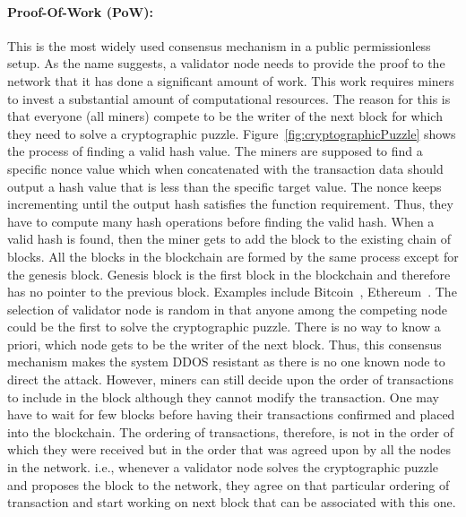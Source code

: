 \paragraph{Proof-Of-Work (PoW):}This is the most widely
used consensus mechanism in a public permissionless setup. As the name
suggests, a validator node needs to provide the proof to the network that it
has done a significant amount of work. This work requires miners to invest a
substantial amount of computational resources. The reason for this is that
everyone (all miners) compete to be the writer of the next block for which they
need to solve a cryptographic puzzle. Figure~\ref{fig:cryptographicPuzzle}
shows the process of finding a valid hash value. The miners are supposed to
find a specific nonce value which when concatenated with the transaction data
should output a hash value that is less than the specific target value. The
nonce keeps incrementing until the output hash satisfies the function
requirement. Thus, they have to compute many hash operations before finding the
valid hash. When a valid hash is found, then the miner gets to add the block to
the existing chain of blocks. All the blocks in the blockchain are formed by
the same process except for the genesis block. Genesis block is the first block
in the blockchain and therefore has no pointer to the previous block. Examples
include Bitcoin~\cite{Bitcoin_Satoshi}, Ethereum~\cite{buterin2013ethereum}. The selection of validator node is random in that
anyone among the competing node could be the first to solve the cryptographic
puzzle. There is no way to know a priori, which node gets to be the writer of
the next block. Thus, this consensus mechanism makes the system DDOS resistant
as there is no one known node to direct the attack. However, miners can still
decide upon the order of transactions to include in the block although they
cannot modify the transaction. One may have to wait for few blocks before
having their transactions confirmed and placed into the blockchain. The
ordering of transactions, therefore, is not in the order of which they were
received but in the order that was agreed upon by all the nodes in the network.
i.e., whenever a validator node solves the cryptographic puzzle and proposes
the block to the network, they agree on that particular ordering of transaction
and start working on next block that can be associated with this one. 

